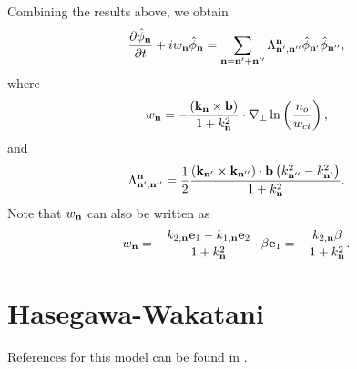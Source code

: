 \documentclass[11pt]{article}
\begin{document}
Combining the results above, we obtain
\begin{equation}
    \frac{\partial \hat{\phi}_{\mathbf{n}}}{\partial t} + i w_{\mathbf{n}} \hat{\phi}_{\mathbf{n}} = \sum_{\mathbf{n} = \mathbf{n}' + \mathbf{n}''} \Lambda^{\mathbf{n}}_{\mathbf{n}', \mathbf{n}''} \hat{\phi}_{\mathbf{n}'} \hat{\phi}_{\mathbf{n}''},
\end{equation}
where
\begin{equation}
    w_{\mathbf{n}} = - \frac{ \left (\mathbf{k}_{\mathbf{n}} \times \mathbf{b} \right ) }{1 + k^2_{\mathbf{n}}} \cdot \nabla_\perp \ln \left ( \frac{n_o}{w_{ci}} \right ),
\end{equation}
and
\begin{equation}
    \Lambda^{\mathbf{n}}_{\mathbf{n}', \mathbf{n}''} = \frac{1}{2} \frac{  \left ( \mathbf{k}_{\mathbf{n}'} \times \mathbf{k}_{\mathbf{n}''} \right ) \cdot \mathbf{b} \left ( k^2_{\mathbf{n}''} - k^2_{\mathbf{n}'} \right ) }{1 + k^2_{\mathbf{n}}}.
\end{equation}
Note that $w_{\mathbf{n}}$ can also be written as
\begin{equation}
    w_{\mathbf{n}} = -\frac{k_{2,\mathbf{n}} \mathbf{e}_1 - k_{1,\mathbf{n}} \mathbf{e}_2}{1 + k^2_{\mathbf{n}}} \cdot \beta \mathbf{e}_1 = -\frac{k_{2,\mathbf{n}} \beta}{1 + k^2_{\mathbf{n}}}.
\end{equation}

\section{Hasegawa-Wakatani}
References for this model can be found in \cite{wakatani1984,hasegawa1987}.

\end{document}
